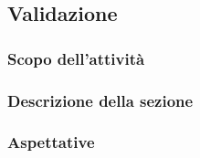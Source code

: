 \subsection{Validazione}
\subsubsection{Scopo dell'attività} 
\subsubsection{Descrizione della sezione} 
\subsubsection{Aspettative}
